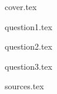 \documentclass[a4paper]{article}
\begin{document}
{cover.tex}

\tableofcontents
\newpage

{question1.tex}

{question2.tex}

{question3.tex}

{sources.tex}
\end{document}
